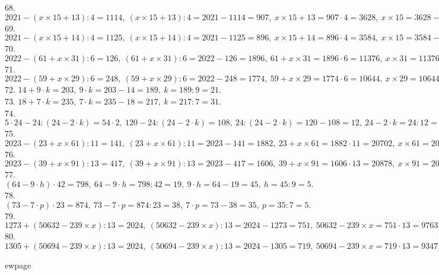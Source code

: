 68. $2021-(x\times15+13):4=1114,\ (x\times15+13):4=2021-1114=907,\ x\times15+13=907\cdot4=3628,\ x\times15=3628-13=3615,\ x=3615:15=241.$\\
69. $2021-(x\times15+14):4=1125,\ (x\times15+14):4=2021-1125=896,\ x\times15+14=896\cdot4=3584,\ x\times15=3584-14=3570,\ x=3570:15=238.$\\
70. $2022-(61+x\times31):6=126,\ (61+x\times31):6=2022-126=1896,\ 61+x\times31=1896\cdot6=11376,\ x\times31=11376-61=11315,\ x=11315:31=365.$\\
71. $2022-(59+x\times29):6=248,\ (59+x\times29):6=2022-248=1774,\ 59+x\times29=1774\cdot6=10644,\ x\times29=10644-59=10585,\ x=10585:29=365.$\\
72. $14+9\cdot k=203,\ 9\cdot k=203-14=189,\ k=189:9=21.$\\
73. $18+7\cdot k=235,\ 7\cdot k=235-18=217,\ k=217:7=31.$\\
74. $5\cdot24-24:(24-2\cdot k)=54\cdot2,\ 120-24:(24-2\cdot k)=108,\ 24:(24-2\cdot k)=120-108=12,\ 24-2\cdot k=24:12=2,\ 2\cdot k=24-2=22,\ k=22:2=11.$\\
75. $2023 - (23 + x \times 61) : 11 = 141,\ (23 + x \times 61) : 11 =2023-141=1882,\ 23 + x \times 61=1882\cdot11=20702,\ x \times 61=20702-23=20679,\ x=20679:61=339.$\\
76. $2023 - (39 + x \times 91) : 13 = 417,\ (39 + x \times 91) : 13 = 2023-417=1606,\ 39 + x \times 91=1606\cdot13=20878,\ x \times 91=20878-39=20839,\ x=20839:91=229.$\\
77. $(64 - 9 \cdot h) \cdot 42 = 798,\ 64 - 9 \cdot h=798:42=19,\ 9 \cdot h=64-19=45,\ h=45:9=5.$\\
78. $(73 - 7 \cdot p) \cdot 23 = 874,\ 73 - 7 \cdot p=874:23=38,\ 7 \cdot p=73-38=35,\ p=35:7=5.$\\
79. $1273+(50632-239\times x):13=2024,\ (50632-239\times x):13=2024-1273=751,\ 50632-239\times x=751\cdot13=9763,\ 239\times x=50632-9763=40869,\ x=40869:239=171.$\\
80. $1305+(50694-239\times x):13=2024,\ (50694-239\times x):13=2024-1305=719,\ 50694-239\times x=719\cdot13=9347,\ 239\times x=50694-9347=41347,\ x=41347:239=173.$

ewpage
